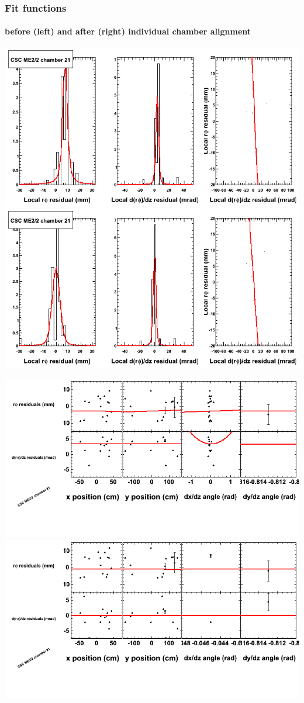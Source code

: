 \documentclass[compress]{beamer}
\begin{document}
\begin{frame}
\frametitle{Fit functions}
\framesubtitle{before (left) and after (right) individual chamber alignment}
\includegraphics[width=0.5\linewidth]{ringfits_3dof/beforefit_MEp22_21_bellcurve.png} \includegraphics[width=0.5\linewidth]{ringfits_3dof/afterfit_MEp22_21_bellcurve.png}

\includegraphics[width=0.5\linewidth]{ringfits_3dof/beforefit_MEp22_21_polynomials.png} \includegraphics[width=0.5\linewidth]{ringfits_3dof/afterfit_MEp22_21_polynomials.png}
\end{frame}
\end{document}
